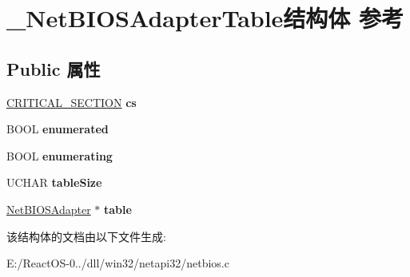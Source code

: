 \hypertarget{struct___net_b_i_o_s_adapter_table}{}\section{\+\_\+\+Net\+B\+I\+O\+S\+Adapter\+Table结构体 参考}
\label{struct___net_b_i_o_s_adapter_table}
\subsection*{Public 属性}
\begin{DoxyCompactItemize}
\item 
\mbox{\label{struct___net_b_i_o_s_adapter_table_a838989c9a3101dda15a14ef12dcee2e8}} 
\hyperlink{struct___c_r_i_t_i_c_a_l___s_e_c_t_i_o_n}{C\+R\+I\+T\+I\+C\+A\+L\+\_\+\+S\+E\+C\+T\+I\+ON} {\bfseries cs}
\item 
\mbox{\label{struct___net_b_i_o_s_adapter_table_a59c0251f423812823265105f7c89afa7}} 
B\+O\+OL {\bfseries enumerated}
\item 
\mbox{\label{struct___net_b_i_o_s_adapter_table_aa725f726510bb3ba4b70ca48b938b877}} 
B\+O\+OL {\bfseries enumerating}
\item 
\mbox{\label{struct___net_b_i_o_s_adapter_table_a4d757e779b8a30ae9b034b4380a2688e}} 
U\+C\+H\+AR {\bfseries table\+Size}
\item 
\mbox{\label{struct___net_b_i_o_s_adapter_table_a4902a0c2ef3f2a32541be40cb3e9f21b}} 
\hyperlink{struct___net_b_i_o_s_adapter}{Net\+B\+I\+O\+S\+Adapter} $\ast$ {\bfseries table}
\end{DoxyCompactItemize}


该结构体的文档由以下文件生成\+:\begin{DoxyCompactItemize}
\item 
E\+:/\+React\+O\+S-\/0../dll/win32/netapi32/netbios.\+c\end{DoxyCompactItemize}
